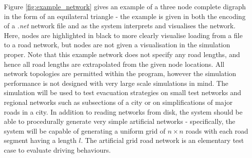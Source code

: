 Figure \ref{fig:example_network} gives an example of a three node complete digraph in the form of an equilateral triangle - the example is given in both the encoding of a \textit{.net} network file and as the system interprets and visualises the network. Here, nodes are highlighted in black to more clearly visualise loading from a file to a road network, but nodes are not given a visualisation in the simulation proper. Note that this example network does not specify any road lengths, and hence all road lengths are extrapolated from the given node locations. All network topologies are permitted within the program, however the simulation performance is not designed with very large scale simulations in mind. The simulation will be used to test evacuation strategies on small test networks and regional networks such as subsections of a city or on simplifications of major roads in a city. In addition to reading networks from disk, the system should be able to procedurally generate very simple artificial networks - specifically, the system will be capable of generating a uniform grid of $n \times n$ roads with each road segment having a length $l$. The artificial grid road network is an elementary test case to evaluate driving behaviours.  

